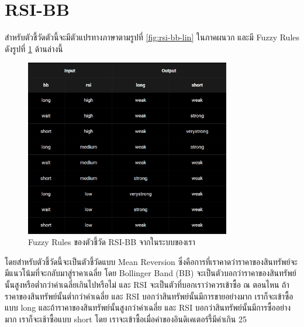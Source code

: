 \section{RSI-BB}
สำหรับตัวชี้วัดตัวนี้จะมีตัวแปรทางภาษาตามรูปที่ \ref{fig:rsi-bb-lin} ในภาคผนวก และมี Fuzzy Rules ดังรูปที่ \ref{fig:rsi-bb-rules} ด้านล่างนี้
\begin{figure}[!ht]
    \centering
    \includegraphics[width=0.8\textwidth]{images/rsi-bb-rules.png}
    \caption{Fuzzy Rules ของตัวชี้วัด RSI-BB จากในระบบของเรา}
    \label{fig:rsi-bb-rules}
\end{figure}

โดยสำหรับตัวชี้วัดนี้จะเป็นตัวชี้วัดแบบ Mean Reversion ซึ่งคือการที่เราคาดว่าราคาของสินทรัพย์จะมีแนวโน้มที่จะกลับมาสู่ราคาเฉลี่ย โดย Bollinger Band (BB) จะเป็นตัวบอกว่าราคาของสินทรัพย์นั้นสูงหรือต่ำกว่าค่าเฉลี่ยเกินไปหรือไม่ และ RSI จะเป็นตัวที่บอกเราว่าควรเข้าซื้อ ณ ตอนไหน ถ้าราคาของสินทรัพย์นั้นต่ำกว่าค่าเฉลี่ย และ RSI บอกว่าสินทรัพย์นั้นมีการขายอย่างมาก เราก็จะเข้าซื้อแบบ long และถ้าราคาของสินทรัพย์นั้นสูงกว่าค่าเฉลี่ย และ RSI บอกว่าสินทรัพย์นั้นมีการซื้ออย่างมาก เราก็จะเช้าซื้อแบบ short โดย เราจะเข้าซื้อเมื่อค่าของอินดิเคเตอร์รี้มีค่าเกิน 25

